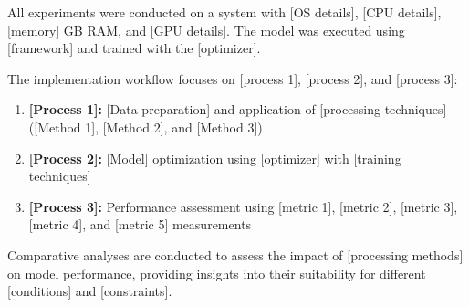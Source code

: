 All experiments were conducted on a system with [OS details], [CPU details], [memory] GB RAM, and [GPU details]. The model was executed using [framework] and trained with the [optimizer].

The implementation workflow focuses on [process 1], [process 2], and [process 3]:

\begin{enumerate}
\item \textbf{[Process 1]:} [Data preparation] and application of [processing techniques] ([Method 1], [Method 2], and [Method 3])
\item \textbf{[Process 2]:} [Model] optimization using [optimizer] with [training techniques]
\item \textbf{[Process 3]:} Performance assessment using [metric 1], [metric 2], [metric 3], [metric 4], and [metric 5] measurements
\end{enumerate}

Comparative analyses are conducted to assess the impact of [processing methods] on model performance, providing insights into their suitability for different [conditions] and [constraints].